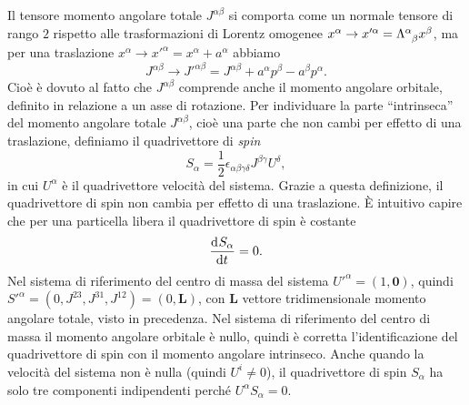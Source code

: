 Il tensore momento angolare totale $J^{\alpha\beta}$ si comporta come un normale
tensore di rango $2$ rispetto alle trasformazioni di Lorentz omogenee
$x^{\alpha} \to x'^{\alpha} = \tensor{\Lambda}{^{\alpha}_{\beta}} x^{\beta}$, ma
per una traslazione $x^{\alpha} \to x'^{\alpha} = x^{\alpha} + a^{\alpha}$
abbiamo
\begin{equation}
  J^{\alpha\beta} \to J'^{\alpha\beta} = J^{\alpha\beta} + a^{\alpha}p^{\beta} -
  a^{\beta}p^{\alpha}.
\end{equation}
Cioè è dovuto al fatto che $J^{\alpha\beta}$ comprende anche il momento angolare
orbitale, definito in relazione a un asse di rotazione.  Per individuare la
parte ``intrinseca'' del momento angolare totale $J^{\alpha\beta}$, cioè una
parte che non cambi per effetto di una traslazione, definiamo il quadrivettore
di \emph{spin}
\begin{equation}
  S_{\alpha} = \frac{1}{2}\epsilon_{\alpha\beta\gamma\delta} J^{\beta\gamma} U^{\delta},
\end{equation}
in cui $U^{\alpha}$ è il quadrivettore velocità del sistema.  Grazie a questa
definizione, il quadrivettore di spin non cambia per effetto di una traslazione.
È intuitivo capire che per una particella libera il quadrivettore di spin è
costante
\begin{equation}
  \frac{{\mathop{}\!\mathrm{d}^{}}S_{\alpha}}{\mathop{}\!\mathrm{d} {t}^{}} = 0.
\end{equation}
Nel sistema di riferimento del centro di massa del sistema
$U'^{\alpha} = (1, \bm{0})$, quindi
$S'^{\alpha} = (0, J^{23}, J^{31}, J^{12}) = (0, \bm{L})$, con $\bm{L}$ vettore
tridimensionale momento angolare totale, visto in precedenza.  Nel sistema di
riferimento del centro di massa il momento angolare orbitale è nullo, quindi è
corretta l'identificazione del quadrivettore di spin con il momento angolare
intrinseco.  Anche quando la velocità del sistema non è nulla (quindi
$U^{i} \neq 0$), il quadrivettore di spin $S_{\alpha}$ ha solo tre componenti
indipendenti perché $U^{\alpha}S_{\alpha} = 0$.


